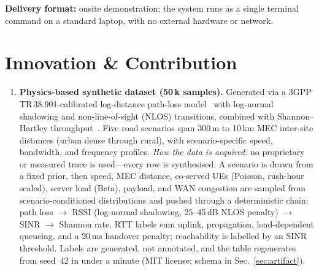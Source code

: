 \documentclass[10pt,conference]{IEEEtran}
\begin{document}
\textbf{Delivery format:} onsite demonstration; the system runs as a single
terminal command on a standard laptop, with no external hardware or network.

\section{Innovation \& Contribution}

\setlength{\itemsep}{0pt}\setlength{\parskip}{0pt}
\begin{enumerate}
  \setlength{\itemsep}{2pt}
  \item \textbf{Physics-based synthetic dataset (50\,k samples).}
        Generated via a 3GPP TR\,38.901-calibrated log-distance path-loss
        model~\cite{3gpp38901} with log-normal shadowing and non-line-of-sight
        (NLOS) transitions, combined with Shannon--Hartley
        throughput~\cite{shannon1948}.  Five road scenarios span 300\,m
        to 10\,km MEC inter-site distances (urban dense through rural),
        with scenario-specific speed, bandwidth, and frequency profiles.
        \emph{How the data is acquired:} no proprietary or measured trace is
        used---every row is synthesised.  A scenario is drawn from a fixed
        prior, then speed, MEC distance, co-served UEs (Poisson, rush-hour
        scaled), server load (Beta), payload, and WAN congestion are sampled
        from scenario-conditioned distributions and pushed through a
        deterministic chain: path loss $\to$ RSSI (log-normal shadowing,
        25--45\,dB NLOS penalty) $\to$ SINR $\to$ Shannon rate.  RTT labels
        sum uplink, propagation, load-dependent queueing, and a 20\,ms
        handover penalty; reachability is labelled by an SINR threshold.
        Labels are generated, not annotated, and the table regenerates from
        seed~42 in under a minute (MIT license; schema in Sec.~\ref{sec:artifact}).


\end{enumerate}
\end{document}

